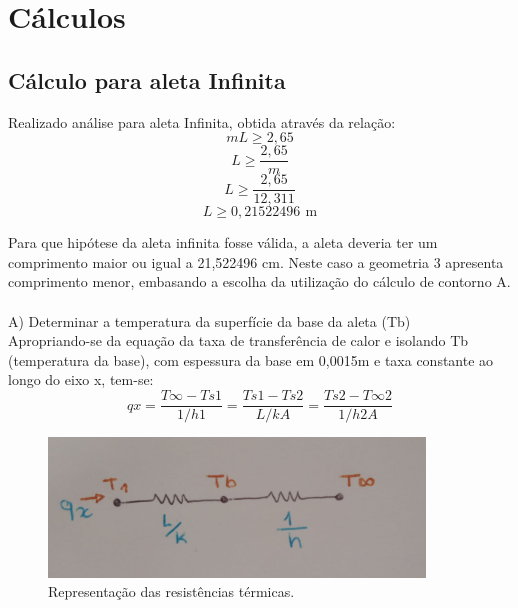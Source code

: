 {\let\clearpage\relax\chapter{Cálculos}\label{cap:calculus}}

\section{Cálculo para aleta Infinita}\label{sec:infity}

Realizado análise para aleta Infinita, obtida através da relação:\\
\begin{equation}
    {m}{L}\geq{2,65}
\end{equation}
\begin{equation}
    {L}\geq{\frac{2,65}{m}}
\end{equation}
\begin{equation}
    {L}\geq{\frac{2,65}{12,311 }}
\end{equation}
\begin{equation}
    {L}\geq{0,21522496\,\SI{}{\meter}}
\end{equation}
\par Para que hipótese da aleta infinita fosse válida, a aleta deveria ter um
comprimento maior ou igual a 21,522496 cm.
Neste caso a geometria 3 apresenta comprimento menor, embasando a
escolha da utilização do cálculo de contorno A.
\\
\\
{\ABNTEXchapterfont\Large{A) Determinar a temperatura da superfície da base da aleta (Tb)}}\\
Apropriando-se da equação da taxa de transferência de calor e isolando Tb (temperatura da base), com espessura da base em 0,0015m e taxa constante ao longo do eixo x, tem-se:
\begin{equation}
    {qx}={\frac{T\infty-Ts1}{1/{h1}}}={\frac{Ts1-Ts2}{L/{{k}{A}}}}={\frac{Ts2-T\infty2}{1/{h2}{A}}}
\end{equation}

\begin{figure}[h]
    \centering
    \caption{Representação das resistências térmicas.}
    \label{fig:res}
    \includegraphics[width=10cm]{figuras/resistenciasTermicas.jpeg}
    \fonteproprioautor
\end{figure}

